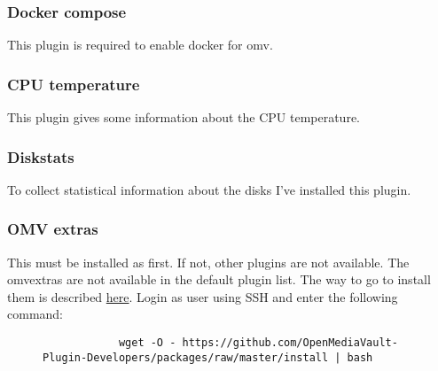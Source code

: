 \subsubsection{Docker compose}\label{sec:compose}

This plugin is required to enable \gls{docker} for \gls{omv}.


\subsubsection{CPU temperature}

This plugin gives some information about the CPU temperature.


\subsubsection{Diskstats}

To collect statistical information about the disks I've installed this plugin.


\subsubsection{OMV extras}

This must be installed as first. If not, other plugins are not available. The
\gls{omvextras} are not available in the default plugin list. The way to go to
install them is described \href{https://github.com/OpenMediaVault-Plugin-Developers/packages}{here}.
Login as user  using SSH and enter the following command:

\begin{figure}[H]
    \centering
    \begin{tiny}
        \begin{BVerbatim}
            wget -O - https://github.com/OpenMediaVault-Plugin-Developers/packages/raw/master/install | bash
        \end{BVerbatim}
    \end{tiny}
\end{figure}

